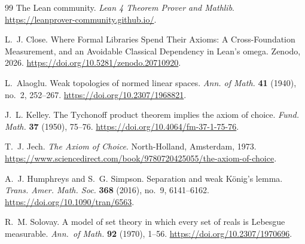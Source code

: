 \documentclass[11pt,reqno]{amsart}
\theoremstyle{redplain}
\begin{document}
\begin{thebibliography}{99}
	 The Lean community.
	\newblock \emph{Lean 4 Theorem Prover and Mathlib}.
	\newblock \url{https://leanprover-community.github.io/}.
	
	 L.~J. Close.
	\newblock Where Formal Libraries Spend Their Axioms: A Cross-Foundation
	Measurement, and an Avoidable Classical Dependency in Lean's omega.
	\newblock Zenodo, 2026.
	\newblock \url{https://doi.org/10.5281/zenodo.20710920}.
	
	 L.~Alaoglu.
	\newblock Weak topologies of normed linear spaces.
	\newblock \emph{Ann. of Math.} \textbf{41} (1940), no.~2, 252--267.
	\newblock \url{https://doi.org/10.2307/1968821}.
	
	 J.~L. Kelley.
	\newblock The Tychonoff product theorem implies the axiom of choice.
	\newblock \emph{Fund. Math.} \textbf{37} (1950), 75--76.
	\newblock \url{https://doi.org/10.4064/fm-37-1-75-76}.
	
	 T.~J. Jech.
	\newblock \emph{The Axiom of Choice}.
	\newblock North-Holland, Amsterdam, 1973.
	\newblock
	\url{https://www.sciencedirect.com/book/9780720425055/the-axiom-of-choice}.
	
	 A.~J. Humphreys and S.~G. Simpson.
	\newblock Separation and weak K\"onig's lemma.
	\newblock \emph{Trans. Amer. Math. Soc.} \textbf{368} (2016), no.~9,
	6141--6162.
	\newblock \url{https://doi.org/10.1090/tran/6563}.
	
	 R.~M. Solovay.
	\newblock A model of set theory in which every set of reals is Lebesgue
	measurable.
	\newblock \emph{Ann.\ of Math.} \textbf{92} (1970), 1--56.
	\newblock \url{https://doi.org/10.2307/1970696}.
	
\end{thebibliography}
\end{document}
